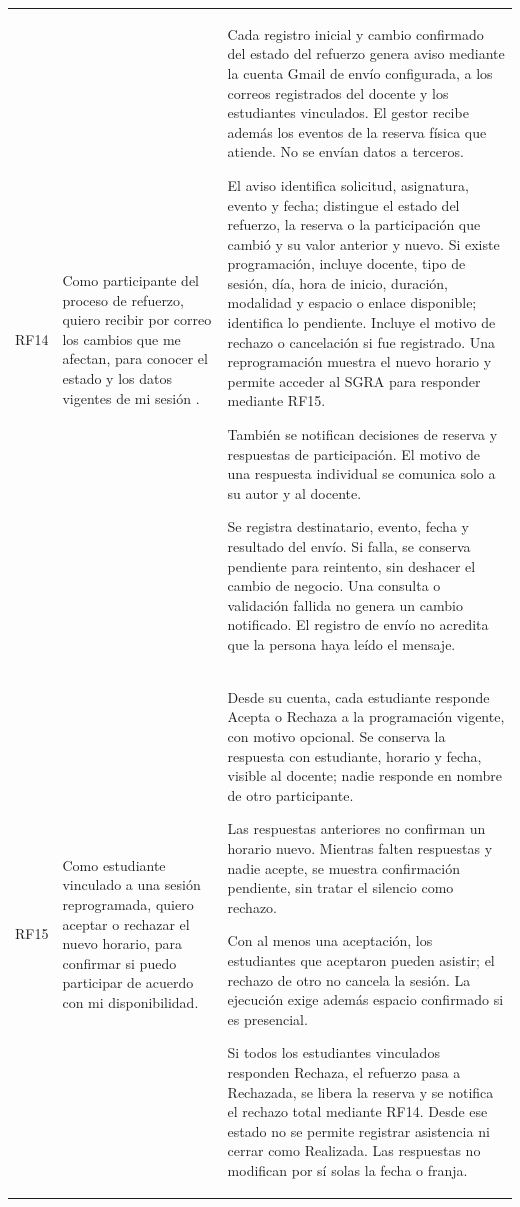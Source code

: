 \begin{longtable}{@{}p{}p{}p{}@{}}
RF14 &
Como participante del proceso de refuerzo, quiero recibir
por correo los cambios que me afectan, para conocer
el estado y los datos vigentes de mi sesión
\cite{Ponce2025-Entrevista,SGRA-documentacion-original}. &
Cada registro inicial y cambio confirmado del estado del
refuerzo genera aviso mediante la cuenta Gmail de envío
configurada, a los correos registrados del docente y los
estudiantes vinculados. El gestor recibe además los eventos
de la reserva física que atiende. No se envían datos a terceros.
\par\smallskip\noindent
El aviso identifica solicitud, asignatura, evento y fecha;
distingue el estado del refuerzo, la reserva o la participación
que cambió y su valor anterior y nuevo. Si existe programación,
incluye docente, tipo de sesión, día, hora de inicio, duración,
modalidad y espacio o enlace disponible; identifica lo pendiente.
Incluye el motivo de rechazo o cancelación si fue registrado.
Una reprogramación muestra el nuevo horario y permite
acceder al SGRA para responder mediante RF15.
\par\smallskip\noindent
También se notifican decisiones de reserva y respuestas de
participación. El motivo de una respuesta individual se
comunica solo a su autor y al docente.
\par\smallskip\noindent
Se registra destinatario, evento, fecha y resultado del envío.
Si falla, se conserva pendiente para reintento, sin deshacer
el cambio de negocio. Una consulta o validación fallida
no genera un cambio notificado. El registro de envío
no acredita que la persona haya leído el mensaje. \\

RF15 &
Como estudiante vinculado a una sesión reprogramada,
quiero aceptar o rechazar el nuevo horario, para confirmar
si puedo participar de acuerdo con mi disponibilidad. &
Desde su cuenta, cada estudiante responde Acepta o Rechaza
a la programación vigente, con motivo opcional. Se conserva
la respuesta con estudiante, horario y fecha, visible al docente;
nadie responde en nombre de otro participante.
\par\smallskip\noindent
Las respuestas anteriores no confirman un horario nuevo.
Mientras falten respuestas y nadie acepte, se muestra
confirmación pendiente, sin tratar el silencio como rechazo.
\par\smallskip\noindent
Con al menos una aceptación, los estudiantes que aceptaron
pueden asistir; el rechazo de otro no cancela la sesión.
La ejecución exige además espacio confirmado si es presencial.
\par\smallskip\noindent
Si todos los estudiantes vinculados responden Rechaza,
el refuerzo pasa a Rechazada, se libera la reserva y se
notifica el rechazo total mediante RF14. Desde ese estado
no se permite registrar asistencia ni cerrar como Realizada.
Las respuestas no modifican por sí solas la fecha o franja. \\
\bottomrule
\end{longtable}

